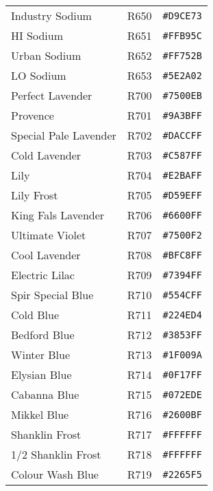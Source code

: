 \documentclass[a4paper]{article}
\begin{document}
\begin{longtable}{|l|l|r|}
Industry Sodium & R650 & \texttt{\#D9CE73} \cellcolor[HTML]{D9CE73} \\
HI Sodium & R651 & \texttt{\#FFB95C} \cellcolor[HTML]{FFB95C} \\
Urban Sodium & R652 & \texttt{\#FF752B} \cellcolor[HTML]{FF752B} \\
LO Sodium & R653 & \texttt{\#5E2A02} \cellcolor[HTML]{5E2A02} \\
Perfect Lavender & R700 & \texttt{\#7500EB} \cellcolor[HTML]{7500EB} \\
Provence & R701 & \texttt{\#9A3BFF} \cellcolor[HTML]{9A3BFF} \\
Special Pale Lavender & R702 & \texttt{\#DACCFF} \cellcolor[HTML]{DACCFF} \\
Cold Lavender & R703 & \texttt{\#C587FF} \cellcolor[HTML]{C587FF} \\
Lily & R704 & \texttt{\#E2BAFF} \cellcolor[HTML]{E2BAFF} \\
Lily Frost & R705 & \texttt{\#D59EFF} \cellcolor[HTML]{D59EFF} \\
King Fals Lavender & R706 & \texttt{\#6600FF} \cellcolor[HTML]{6600FF} \\
Ultimate Violet & R707 & \texttt{\#7500F2} \cellcolor[HTML]{7500F2} \\
Cool Lavender & R708 & \texttt{\#BFC8FF} \cellcolor[HTML]{BFC8FF} \\
Electric Lilac & R709 & \texttt{\#7394FF} \cellcolor[HTML]{7394FF} \\
Spir Special Blue & R710 & \texttt{\#554CFF} \cellcolor[HTML]{554CFF} \\
Cold Blue & R711 & \texttt{\#224ED4} \cellcolor[HTML]{224ED4} \\
Bedford Blue & R712 & \texttt{\#3853FF} \cellcolor[HTML]{3853FF} \\
Winter Blue & R713 & \texttt{\#1F009A} \cellcolor[HTML]{1F009A} \\
Elysian Blue & R714 & \texttt{\#0F17FF} \cellcolor[HTML]{0F17FF} \\
Cabanna Blue & R715 & \texttt{\#072EDE} \cellcolor[HTML]{072EDE} \\
Mikkel Blue & R716 & \texttt{\#2600BF} \cellcolor[HTML]{2600BF} \\
Shanklin Frost & R717 & \texttt{\#FFFFFF} \cellcolor[HTML]{FFFFFF} \\
1/2 Shanklin Frost & R718 & \texttt{\#FFFFFF} \cellcolor[HTML]{FFFFFF} \\
Colour Wash Blue & R719 & \texttt{\#2265F5} \cellcolor[HTML]{2265F5} \\

\end{longtable}
\end{document}
